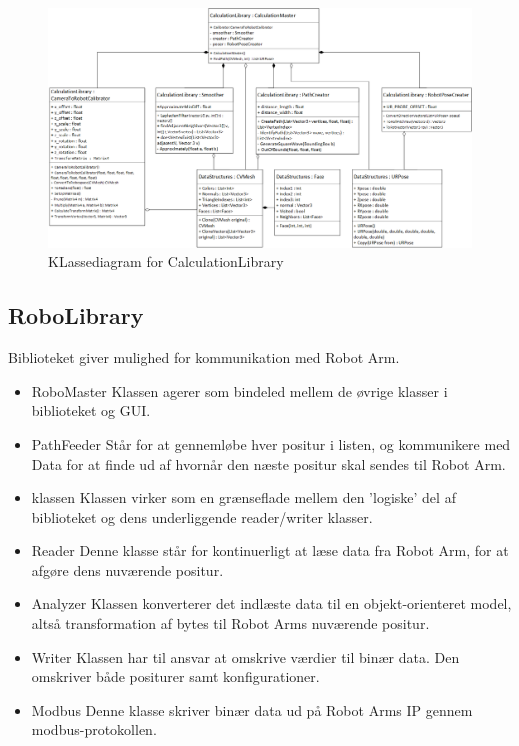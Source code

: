 \begin{figure}[H]
    \centering
    \includegraphics[width=1\textwidth]{figurer/d/Design/Class/uml_class_calculationlibrary}
    \caption{KLassediagram for CalculationLibrary}
    \label{class_ConversionLib}
\end{figure}
\newpage

\subsection{RoboLibrary}
Biblioteket giver mulighed for kommunikation med Robot Arm.

\begin{itemize}
\item{RoboMaster}
Klassen agerer som bindeled mellem de øvrige klasser i biblioteket og GUI.

\item{PathFeeder} 
Står for at gennemløbe hver positur i listen, og kommunikere med Data for at finde ud af hvornår den næste positur skal sendes til Robot Arm.

\item{klassen}
Klassen virker som en grænseflade mellem den 'logiske' del af biblioteket og dens underliggende reader/writer klasser.

\item{Reader}
Denne klasse står for kontinuerligt at læse data fra Robot Arm, for at afgøre dens nuværende positur. 

\item{Analyzer} 
Klassen konverterer det indlæste data til en objekt-orienteret model, altså transformation af bytes til Robot Arms nuværende positur.

\item{Writer}
Klassen har til ansvar at omskrive værdier til binær data. Den omskriver både positurer samt konfigurationer.

\item{Modbus}
Denne klasse skriver binær data ud på Robot Arms IP gennem modbus-protokollen.
\end{itemize}

